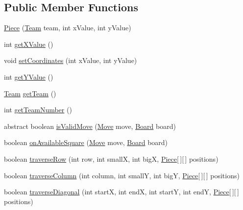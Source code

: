 \subsection*{Public Member Functions}
\begin{DoxyCompactItemize}
\item 
\hyperlink{class_model_1_1_pieces_1_1_piece_ad2e15ca4e0598c0ff8db23e61bf40ef2}{Piece} (\hyperlink{class_model_1_1_team}{Team} team, int x\+Value, int y\+Value)
\item 
int \hyperlink{class_model_1_1_pieces_1_1_piece_a7390da3b01de7a30694042ad77bd2ee4}{get\+X\+Value} ()
\item 
void \hyperlink{class_model_1_1_pieces_1_1_piece_ae4b44d64ae344e87088a8a36f8742df2}{set\+Coordinates} (int x\+Value, int y\+Value)
\item 
int \hyperlink{class_model_1_1_pieces_1_1_piece_ae211bc6f3f2adf995de3bfa1ab5dfc7b}{get\+Y\+Value} ()
\item 
\hyperlink{class_model_1_1_team}{Team} \hyperlink{class_model_1_1_pieces_1_1_piece_a09296502e0f03fe8d9223060943079ca}{get\+Team} ()
\item 
int \hyperlink{class_model_1_1_pieces_1_1_piece_a86728adbff75375d1b704acfb3dfd994}{get\+Team\+Number} ()
\item 
abstract boolean \hyperlink{class_model_1_1_pieces_1_1_piece_a5415845a97251b8c8da29956769c4f3e}{is\+Valid\+Move} (\hyperlink{class_model_1_1_move}{Move} move, \hyperlink{class_model_1_1_board}{Board} board)
\item 
boolean \hyperlink{class_model_1_1_pieces_1_1_piece_a727ec49c761935c667c5db1279485475}{on\+Available\+Square} (\hyperlink{class_model_1_1_move}{Move} move, \hyperlink{class_model_1_1_board}{Board} board)
\item 
boolean \hyperlink{class_model_1_1_pieces_1_1_piece_a24ae3b8d9b15adcdf3316bfc0afa081c}{traverse\+Row} (int row, int smallX, int bigX, \hyperlink{class_model_1_1_pieces_1_1_piece}{Piece}\mbox{[}$\,$\mbox{]}\mbox{[}$\,$\mbox{]} positions)
\item 
boolean \hyperlink{class_model_1_1_pieces_1_1_piece_a31899e5f9279757bf8a9706df713b4a7}{traverse\+Column} (int column, int smallY, int bigY, \hyperlink{class_model_1_1_pieces_1_1_piece}{Piece}\mbox{[}$\,$\mbox{]}\mbox{[}$\,$\mbox{]} positions)
\item 
boolean \hyperlink{class_model_1_1_pieces_1_1_piece_a37e2c4e79bbcbd2642f79439fd2129a8}{traverse\+Diagonal} (int startX, int endX, int startY, int endY, \hyperlink{class_model_1_1_pieces_1_1_piece}{Piece}\mbox{[}$\,$\mbox{]}\mbox{[}$\,$\mbox{]} positions)

\end{DoxyCompactItemize}
